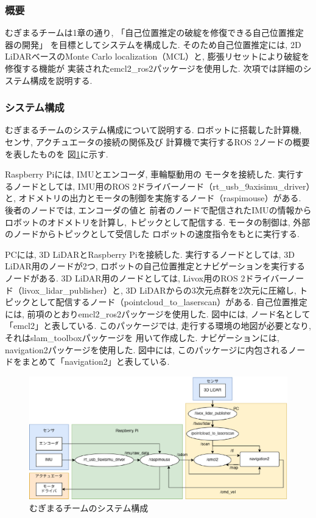 \subsubsection{概要}
むぎまるチームは1章の通り, 「自己位置推定の破綻を修復できる自己位置推定器の開発」
を目標としてシステムを構成した. 
そのため自己位置推定には, 2D LiDARベースのMonte Carlo localization（MCL）\cite{fox1999etal}と, 
膨張リセット\cite{ueda2004iros}により破綻を修復する機能が
実装されたemcl2\_ros2パッケージ\cite{emcl2_ros2}を使用した. 
次項では詳細のシステム構成を説明する. 
\subsubsection{システム構成}
むぎまるチームのシステム構成について説明する. 
ロボットに搭載した計算機, センサ, アクチュエータの接続の関係及び
計算機で実行するROS 2ノードの概要を表したものを
図\ref{fig:mugimaru_system}に示す. 

Raspberry Piには, IMUとエンコーダ, 車輪駆動用の
モータを接続した. 
実行するノードとしては, IMU用のROS 2ドライバーノード（rt\_usb\_9axisimu\_driver）と, 
オドメトリの出力とモータの制御を実施するノード（raspimouse）がある. 
後者のノードでは, エンコーダの値と
前者のノードで配信されたIMUの情報からロボットのオドメトリを計算し, 
トピックとして配信する. 
モータの制御は, 外部のノードからトピックとして受信した
ロボットの速度指令をもとに実行する. 

PCには, 3D LiDARとRaspberry Piを接続した. 
実行するノードとしては, 3D LiDAR用のノードが2つ, 
ロボットの自己位置推定とナビゲーションを実行するノードがある. 
3D LiDAR用のノードとしては, Livox用のROS 2ドライバーノード（livox\_lidar\_publisher）と, 
3D LiDARからの3次元点群を2次元に圧縮し, 
トピックとして配信するノード（pointcloud\_to\_laserscan）がある. 
自己位置推定には, 前項のとおりemcl2\_ros2パッケージを使用した. 
図中には, ノード名として「emcl2」と表している. 
このパッケージでは, 走行する環境の地図が必要となり, 
それはslam\_toolboxパッケージ\cite{slam_toolbox}を
用いて作成した. 
ナビゲーションには, navigation2パッケージ\cite{nav2}を使用した. 
図中には, このパッケージに内包されるノードをまとめて「navigation2」と表している. 

\begin{figure}[h]
  \begin{center}
    \includegraphics[width=1.0\linewidth]{figs/mugimaru_system_2024.eps}
    \caption{むぎまるチームのシステム構成}
    \label{fig:mugimaru_system}
  \end{center}
\end{figure}

